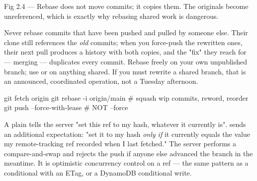\begin{wbfigure}{Fig 2.4 — Rebase does not move commits; it copies them. The originals become unreferenced, which is exactly why rebasing shared work is dangerous.}
\end{wbfigure}

\begin{secwarn}
Never rebase commits that have been pushed and pulled by someone else. Their clone still references the \emph{old} commits; when you force-push the rewritten ones, their next pull produces a history with both copies, and the "fix" they reach for --- merging --- duplicates every commit. Rebase freely on your own unpublished branch; use  or  on anything shared. If you must rewrite a shared branch, that is an announced, coordinated operation, not a Tuesday afternoon.
\end{secwarn}

\begin{bashbox}
git fetch origin
git rebase -i origin/main     # squash wip commits, reword, reorder
git push --force-with-lease   # NOT --force
\end{bashbox}

 A plain  tells the server "set this ref to my hash, whatever it currently is".  sends an additional expectation: "set it to my hash \emph{only if} it currently equals the value my remote-tracking ref recorded when I last fetched." The server performs a compare-and-swap and rejects the push if anyone else advanced the branch in the meantime. It is optimistic concurrency control on a ref --- the same pattern as a conditional  with an ETag, or a DynamoDB conditional write.

